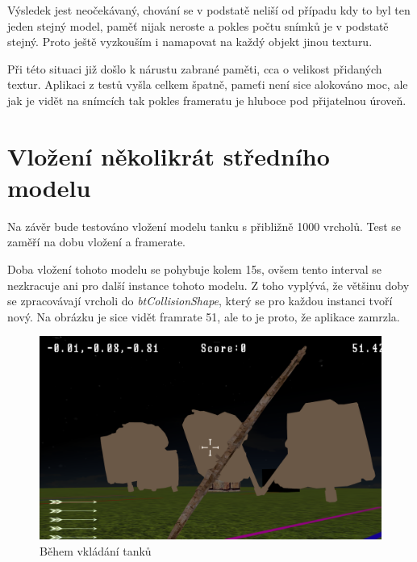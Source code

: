 Výsledek jest neočekávaný, chování se v podstatě neliší od případu kdy to byl ten jeden stejný model, paměť nijak neroste a pokles počtu snímků je v podstatě stejný. Proto ještě vyzkouším i namapovat na každý objekt jinou texturu. 

Při této situaci již došlo k nárustu zabrané paměti, cca o velikost přidaných textur. Aplikaci z testů vyšla celkem špatně, pameťi není sice alokováno moc, ale jak je vidět na snímcích tak pokles frameratu je hluboce pod přijatelnou úroveň.
\section{Vložení několikrát středního modelu}
Na závěr bude testováno vložení modelu tanku s přibližně 1000 vrcholů. Test se zaměří na dobu vložení a framerate.  

Doba vložení tohoto modelu se pohybuje kolem 15s, ovšem tento interval se nezkracuje ani pro další instance tohoto modelu. Z toho vyplývá, že většinu doby se zpracovávají vrcholi do \emph{btCollisionShape}, který se pro každou instanci tvoří nový. Na obrázku je sice vidět framrate 51, ale to je proto, že aplikace zamrzla.
\begin{figure}[!tbp]
	\centering
	\begin{minipage}[b]{0.4\textwidth}
		\includegraphics[width=\textwidth]{obrazky-figures/21}
		\caption{Během vkládání tanků}
	\end{minipage}
	\hfill
	\begin{minipage}[b]{0.4\textwidth}

	\end{minipage}
\end{figure}
